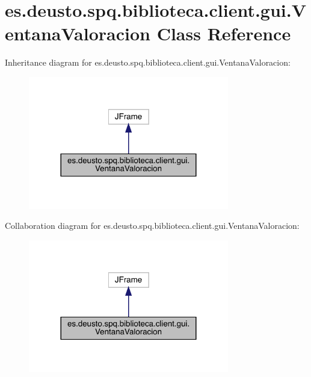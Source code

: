 \hypertarget{classes_1_1deusto_1_1spq_1_1biblioteca_1_1client_1_1gui_1_1_ventana_valoracion}{}\section{es.\+deusto.\+spq.\+biblioteca.\+client.\+gui.\+Ventana\+Valoracion Class Reference}
\label{classes_1_1deusto_1_1spq_1_1biblioteca_1_1client_1_1gui_1_1_ventana_valoracion}


Inheritance diagram for es.\+deusto.\+spq.\+biblioteca.\+client.\+gui.\+Ventana\+Valoracion\+:
\nopagebreak
\begin{figure}[H]
\begin{center}
\leavevmode
\includegraphics[width=248pt]{classes_1_1deusto_1_1spq_1_1biblioteca_1_1client_1_1gui_1_1_ventana_valoracion__inherit__graph}
\end{center}
\end{figure}


Collaboration diagram for es.\+deusto.\+spq.\+biblioteca.\+client.\+gui.\+Ventana\+Valoracion\+:
\nopagebreak
\begin{figure}[H]
\begin{center}
\leavevmode
\includegraphics[width=248pt]{classes_1_1deusto_1_1spq_1_1biblioteca_1_1client_1_1gui_1_1_ventana_valoracion__coll__graph}
\end{center}
\end{figure}
